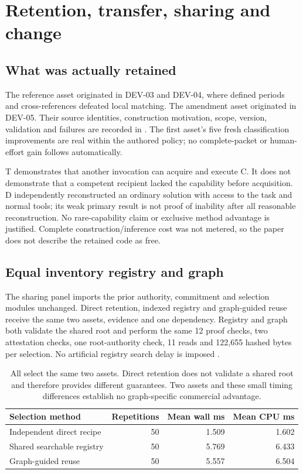 \documentclass[10pt,a4paper]{article}
\begin{document}
\section{Retention, transfer, sharing and change}
\subsection{What was actually retained}
The reference asset originated in DEV-03 and DEV-04, where defined periods and cross-references defeated local matching. The amendment asset originated in DEV-05. Their source identities, construction motivation, scope, version, validation and failures are recorded in . The first asset's five fresh classification improvements are real within the authored policy; no complete-packet or human-effort gain follows automatically.

T demonstrates that another invocation can acquire and execute C. It does not demonstrate that a competent recipient lacked the capability before acquisition. D independently reconstructed an ordinary solution with access to the task and normal tools; its weak primary result is not proof of inability after all reasonable reconstruction. No rare-capability claim or exclusive method advantage is justified. Complete construction/inference cost was not metered, so the paper does not describe the retained code as free.

\subsection{Equal inventory registry and graph}
The sharing panel imports the prior authority, commitment and selection modules unchanged. Direct retention, indexed registry and graph-guided reuse receive the same two assets, evidence and one dependency. Registry and graph both validate the shared root and perform the same 12 proof checks, two attestation checks, one root-authority check, 11 reads and 122,655 hashed bytes per selection. No artificial registry search delay is imposed \cite{graphdata}.

\begin{table}[H]\small
\begin{tabularx}{\textwidth}{@{}Yrrr@{}}\toprule
\textbf{Selection method} & \textbf{Repetitions} & \textbf{Mean wall ms} & \textbf{Mean CPU ms}\\\midrule
Independent direct recipe & 50 & 1.509 & 1.602\\
Shared searchable registry & 50 & 5.769 & 6.433\\
Graph-guided reuse & 50 & 5.557 & 6.504\\\bottomrule
\end{tabularx}
\caption{All select the same two assets. Direct retention does not validate a shared root and therefore provides different guarantees. Two assets and these small timing differences establish no graph-specific commercial advantage.}
\end{table}
\end{document}

